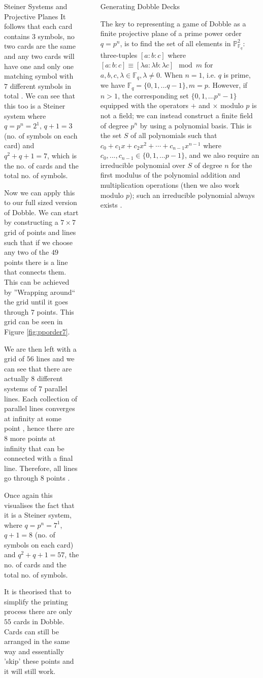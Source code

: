 \documentclass[final]{beamer}
\newlength{\sepwidth}
\newlength{\colwidth}
\newcommand{\separatorcolumn}{\begin{column}{\sepwidth}\end{column}}
\begin{document}
\begin{frame}[t]
\begin{columns}[t]
\begin{column}{\colwidth}
\begin{block}{Steiner Systems and Projective Planes}
    It follows that each card contains $3$ symbols, no two cards are the same and any two cards will have one and only one matching symbol with $7$ different symbols in total \cite{westenbrink2022}.
    We can see that this too is a Steiner system where $q = p^n = 2^1$, $q + 1 = 3$ (no. of symbols on each card) and $q^2 + q + 1 = 7$, which is the no. of cards and the total no. of symbols.
    
    Now we can apply this to our full sized version of Dobble. We can start by constructing a $7\times7$ grid of points and lines such that if we choose any two of the $49$ points there is a line that connects them. This can be achieved by ''Wrapping around`` the grid until it goes through $7$ points. This grid can be seen in Figure \ref{fig:pporder7}.

    We are then left with a grid of $56$ lines and we can see that there are actually $8$ different systems of $7$ parallel lines. Each collection of parallel lines converges at infinity at some point \cite{spencer1999}, hence there are $8$ more points at infinity that can be connected with a final line. Therefore, all lines go through $8$ points \cite{Parker2021}.

    Once again this visualises the fact that it is a Steiner system, where $q = p^n = 7^1$, $q + 1 = 8$ (no. of symbols on each card) and $q^2 + q + 1 = 57$, the no. of cards and the total no. of symbols. 

    It is theorised that to simplify the printing process there are only $55$ cards in Dobble. Cards can still be arranged in the same way and essentially 'skip' these points and it will still work. 
\end{block}
\end{column}

\separatorcolumn

\begin{column}{\colwidth}

  \begin{exampleblock}{Generating Dobble Decks}

    The key to representing a game of Dobble as a finite projective plane of a prime power order $q = p^n$, is to find the set of all elements in $\mathbb{P}^2_{\mathbb{F}_q}$: three-tuples $[a:b:c]$ where $[a:b:c] \equiv [\lambda a:\lambda b:\lambda c] \mod m$ for $a,b,c,\lambda \in \mathbb{F}_q, \lambda \ne 0$. When $n = 1$, i.e. $q$ is prime, we have $\mathbb{F}_q = \{0, 1, ... q-1\}, m = p$. However, if $n > 1$, the corresponding set $\{ 0, 1, ... p^n-1 \}$ equipped with the operators $+$ and $\times$ modulo $p$ is not a field; we can instead construct a finite field of degree $p^n$ by using a polynomial basis. This is the set $S$ of all polynomials such that $c_0 + c_1x + c_2x^2 + \cdots + c_{n-1}x^{n-1}$ where $c_0, ..., c_{n-1} \in \{0, 1, ... p-1\}$, and we also require an irreducible polynomial over $S$ of degree $n$ for the first modulus of the polynomial addition and multiplication operations (then we also work modulo $p$); such an irreducible polynomial always exists \cite{magidin2012}.


\end{exampleblock}
\end{column}
\end{columns}
\end{frame}
\end{document}
